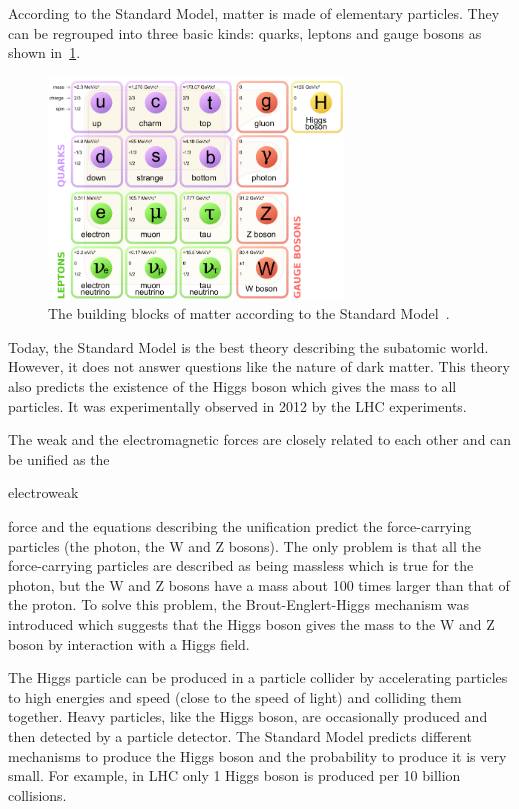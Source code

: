 According to the Standard Model, matter is made of elementary
particles. They can be regrouped into three basic kinds: quarks,
leptons and gauge bosons as shown in~\cref{fig:standardmodel}.

\begin{figure}[htbp]
  \centering
  \includegraphics[width=0.7\textwidth]{figures/CLIC/StandardModel.png}
  \caption{The building blocks of matter according to the Standard
    Model~\cite{wikipediaParticles}.}
  \label{fig:standardmodel}
\end{figure}

Today, the Standard Model is the best theory describing the subatomic
world. However, it does not answer questions like the nature of dark
matter. This theory also predicts the existence of the Higgs boson
which gives the mass to all particles. It was experimentally observed
in 2012 by the LHC experiments.

The weak and the electromagnetic forces are closely related to each
other and can be unified as the \begin{it}electroweak\end{it} force
and the equations describing the unification predict the
force-carrying particles (the photon, the W and Z bosons). The only
problem is that all the force-carrying particles are described as
being massless which is true for the photon, but the W and Z bosons
have a mass about 100 times larger than that of the proton. To solve
this problem, the Brout-Englert-Higgs mechanism was introduced which
suggests that the Higgs boson gives the mass to the W and Z boson by
interaction with a Higgs field.

The Higgs particle can be produced in a particle collider by
accelerating particles to high energies and speed (close to the speed
of light) and colliding them together. Heavy particles, like the Higgs
boson, are occasionally produced and then detected by a particle
detector. The Standard Model predicts different mechanisms to produce
the Higgs boson and the probability to produce it is very small. For
example, in LHC only 1 Higgs boson is produced per 10 billion
collisions.

